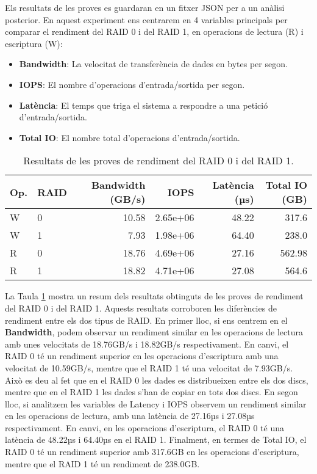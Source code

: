 Els resultats de les proves es guardaran en un fitxer JSON per a un anàlisi posterior. En aquest experiment ens centrarem en 4 variables principals per comparar el rendiment del RAID 0 i del RAID 1, en operacions de lectura (R) i escriptura (W):
\begin{itemize}
        \item \textbf{Bandwidth}: La velocitat de transferència de dades en bytes per segon.
        \item \textbf{IOPS}: El nombre d'operacions d'entrada/sortida per segon.
        \item \textbf{Latència}: El temps que triga el sistema a respondre a una petició d'entrada/sortida.
        \item \textbf{Total IO}: El nombre total d'operacions d'entrada/sortida.
\end{itemize}

\begin{table}[!htb]
\begin{tabular}{|l|l|r|r|r|r|}
\hline
Op. & RAID & \textbf{Bandwidth} (GB/s) & \textbf{IOPS} & \textbf{Latència} (µs) &\textbf{Total IO} (GB) \\
\hline
W &  0 & 10.58 & 2.65e+06 & 48.22 & 317.6 \\
W &  1 & 7.93 & 1.98e+06 & 64.40 & 238.0 \\
R &  0 & 18.76 & 4.69e+06 & 27.16 & 562.98 \\
R &  1 & 18.82 & 4.71e+06 & 27.08 & 564.6 \\
\hline
\end{tabular}
\caption{Resultats de les proves de rendiment del RAID 0 i del RAID 1.}
\label{table:raid-performance}
\end{table}

La Taula \ref{table:raid-performance} mostra un resum dels resultats obtinguts de les proves de rendiment del RAID 0 i del RAID 1. Aquests resultats corroboren les diferències de rendiment entre els dos tipus de RAID. En primer lloc, si ens centrem en el \textbf{Bandwidth}, podem observar un rendiment similar en les operacions de lectura amb unes velocitats de 18.76GB/s i 18.82GB/s respectivament. En canvi, el RAID 0 té un rendiment superior en les operacions d'escriptura amb una velocitat de 10.59GB/s, mentre que el RAID 1 té una velocitat de 7.93GB/s. Això es deu al fet que en el RAID 0 les dades es distribueixen entre els dos discs, mentre que en el RAID 1 les dades s'han de copiar en tots dos discs. En segon lloc, si analitzem les variables de Latency i IOPS observem un rendiment similar en les operacions de lectura, amb una latència de 27.16µs i 27.08µs respectivament. En canvi, en les operacions d'escriptura, el RAID 0 té una latència de 48.22µs i 64.40µs en el RAID 1. Finalment, en termes de Total IO, el RAID 0 té un rendiment superior amb 317.6GB en les operacions d'escriptura, mentre que el RAID 1 té un rendiment de 238.0GB.


